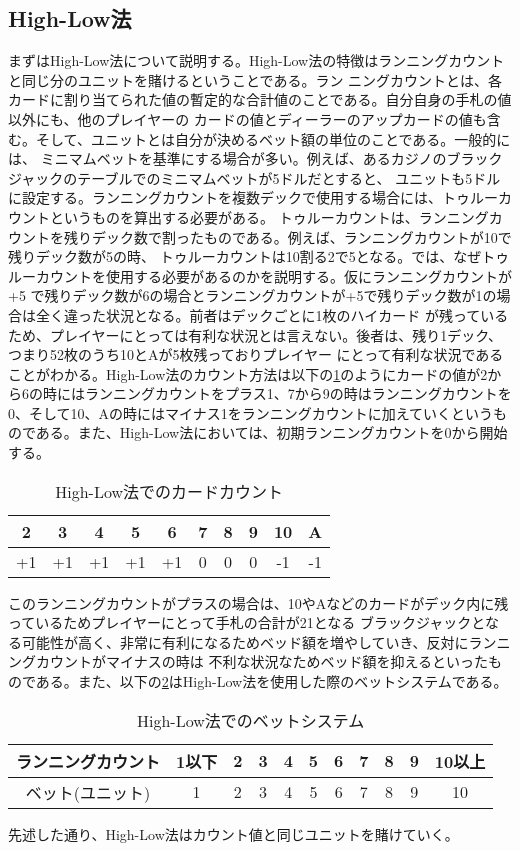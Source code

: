 \subsection{High-Low法}
まずはHigh-Low法について説明する。High-Low法の特徴はランニングカウントと同じ分のユニットを賭けるということである。ラン
ニングカウントとは、各カードに割り当てられた値の暫定的な合計値のことである。自分自身の手札の値以外にも、他のプレイヤーの
カードの値とディーラーのアップカードの値も含む。そして、ユニットとは自分が決めるベット額の単位のことである。一般的には、
ミニマムベットを基準にする場合が多い。例えば、あるカジノのブラックジャックのテーブルでのミニマムベットが5ドルだとすると、
ユニットも5ドルに設定する。ランニングカウントを複数デックで使用する場合には、トゥルーカウントというものを算出する必要がある。
トゥルーカウントは、ランニングカウントを残りデック数で割ったものである。例えば、ランニングカウントが10で残りデック数が5の時、
トゥルーカウントは10割る2で5となる。では、なぜトゥルーカウントを使用する必要があるのかを説明する。仮にランニングカウントが+5
で残りデック数が6の場合とランニングカウントが+5で残りデック数が1の場合は全く違った状況となる。前者はデックごとに1枚のハイカード
が残っているため、プレイヤーにとっては有利な状況とは言えない。後者は、残り1デック、つまり52枚のうち10とAが5枚残っておりプレイヤー
にとって有利な状況であることがわかる。High-Low法のカウント方法は以下の\ref{hlc}のようにカードの値が2から6の時にはランニングカウントをプラス1、7から9の時はランニングカウントを0、そして10、Aの時にはマイナス1をランニングカウントに加えていくというものである。また、High-Low法においては、初期ランニングカウントを0から開始する。
  \begin{table}[H]
    \centering
    \label{hlc}
    \caption{High-Low法でのカードカウント}
    \begin{tabular}{|c|c|c|c|c|c|c|c|c|c|} \hline
      2&3&4&5&6&7&8&9&10&A \\ \hline
      +1&+1&+1&+1&+1&0&0&0&-1&-1 \\ \hline
    \end{tabular}
  \end{table}
このランニングカウントがプラスの場合は、10やAなどのカードがデック内に残っているためプレイヤーにとって手札の合計が21となる
ブラックジャックとなる可能性が高く、非常に有利になるためベッド額を増やしていき、反対にランニングカウントがマイナスの時は
不利な状況なためベッド額を抑えるといったものである。また、以下の\ref{hlb}はHigh-Low法を使用した際のベットシステムである。
  \begin{table}[H]
    \centering
    \label{hlb}
    \caption{High-Low法でのベットシステム}
    \begin{tabular}{|c|c|c|c|c|c|c|c|c|c|c|} \hline
      ランニングカウント&1以下&2&3&4&5&6&7&8&9&10以上 \\ \hline
      ベット(ユニット)&1&2&3&4&5&6&7&8&9&10 \\ \hline
    \end{tabular}
  \end{table}
先述した通り、High-Low法はカウント値と同じユニットを賭けていく。

